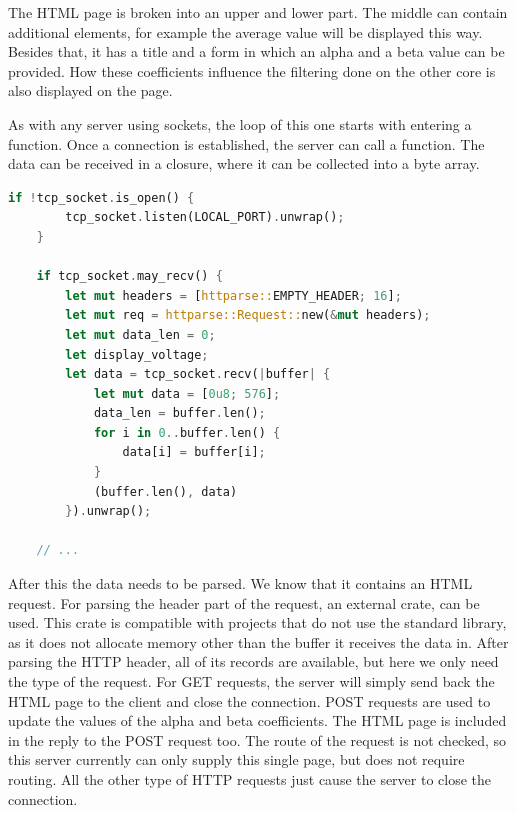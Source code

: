 The HTML page is broken into an upper and lower part. The middle can contain additional elements, for example the average value will be displayed this way. Besides that, it has a title and a form in which an alpha and a beta value can be provided. How these coefficients influence the filtering done on the other core is also displayed on the page.

As with any server using sockets, the loop of this one starts with entering a  function. Once a connection is established, the server can call a  function. The data can be received in a closure, where it can be collected into a byte array.

\begin{lstlisting}[language=Rust,frame=single,float=!ht,style=customrust,label={lst:server-recv},caption={Receiving the Contents of the TCP Buffer}]
    if !tcp_socket.is_open() {
        tcp_socket.listen(LOCAL_PORT).unwrap();
    }

    if tcp_socket.may_recv() {
        let mut headers = [httparse::EMPTY_HEADER; 16];
        let mut req = httparse::Request::new(&mut headers);
        let mut data_len = 0;
        let display_voltage;
        let data = tcp_socket.recv(|buffer| {
            let mut data = [0u8; 576];
            data_len = buffer.len();
            for i in 0..buffer.len() {
                data[i] = buffer[i];
            }
            (buffer.len(), data)
        }).unwrap();

    // ...
\end{lstlisting}

After this the data needs to be parsed. We know that it contains an HTML request. For parsing the header part of the request, an external crate,  can be used. This crate is compatible with projects that do not use the standard library, as it does not allocate memory other than the buffer it receives the data in. \cite{Httparse} After parsing the HTTP header, all of its records are available, but here we only need the type of the request. For GET requests, the server will simply send back the HTML page to the client and close the connection. POST requests are used to update the values of the alpha and beta coefficients. The HTML page is included in the reply to the POST request too. The route of the request is not checked, so this server currently can only supply this single page, but does not require routing. All the other type of HTTP requests just cause the server to close the connection.

